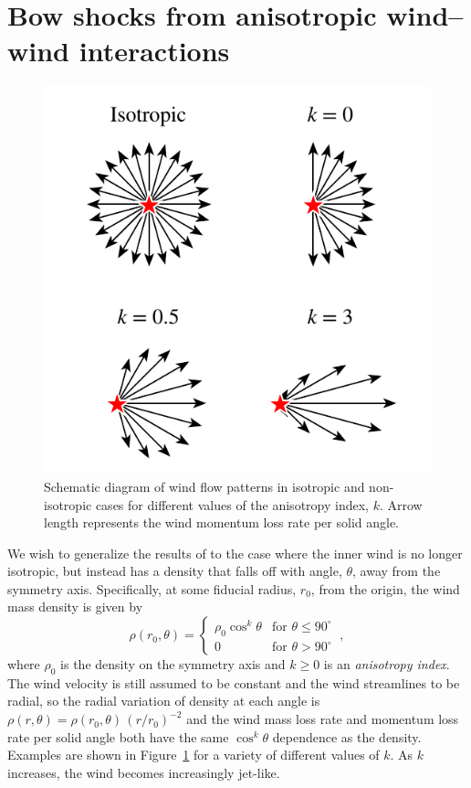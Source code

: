
\section{Bow shocks from anisotropic wind--wind interactions}
\label{app:ancantoid}
\begin{figure}
  \centering
  \includegraphics[width=\linewidth]{figs/anisotropic-arrows}
  \caption[]{Schematic diagram of wind flow patterns in isotropic and
    non-isotropic cases for different values of the anisotropy index,
    \(k\).  Arrow length represents the wind momentum loss rate per
    solid angle.}
  \label{fig:anisotropic-arrows}
\end{figure}


We wish to generalize the results of \citet[\CRW{}]{Canto:1996} to the
case where the inner wind is no longer isotropic, but instead has a
density that falls off with angle, \(\theta\), away from the symmetry axis.
Specifically, at some fiducial radius, \(r_0\), from the origin, the
wind mass density is given by
\begin{equation}
  \label{eq:ancantoid-density}
  \rho(r_0, \theta) =
  \begin{cases}
    \rho_0 \cos^k \theta & \text{for \(\theta \le 90^\circ\)} \\
    0 & \text{for \(\theta > 90^\circ\)}
  \end{cases}
  \ ,
\end{equation}
where \(\rho_0\) is the density on the symmetry axis and \(k \ge 0\) is an
\textit{anisotropy index}.  The wind velocity is still assumed to be
constant and the wind streamlines to be radial, so the radial
variation of density at each angle is
\(\rho(r, \theta) = \rho(r_0, \theta)\, (r/r_0)^{-2}\) and the wind mass loss rate and
momentum loss rate per solid angle both have the same \(\cos^k\theta\)
dependence as the density.  Examples are shown in
Figure~\ref{fig:anisotropic-arrows} for a variety of different values
of \(k\).  As \(k\) increases, the wind becomes increasingly jet-like.

